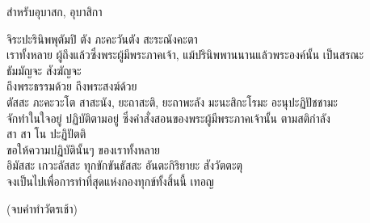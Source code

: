 \documentclass{article}
\begin{document}
\begin{center}สำหรับอุบาสก, อุบาสิกา\end{center}
จิระปะรินิพพุตัมปิ ตัง ภะคะวันตัง สะระณังคะตา\\
\indent เราทั้งหลาย ผู้ถึงแล้วซึ่งพระผู้มีพระภาคเจ้า,
แม้ปรินิพพานนานแล้วพระองค์นั้น เป็นสรณะ\\
ธัมมัญจะ สังฆัญจะ\\
\indent ถึงพระธรรมด้วย ถึงพระสงฆ์ด้วย\\
ตัสสะ ภะคะวะโต สาสะนัง, ยะถาสะติ, ยะถาพะลัง
มะนะสิกะโรมะ อะนุปะฏิปัชชามะ\\
\indent จักทำในใจอยู่ ปฏิบัติตามอยู่ ซึ่งคำสั่งสอนของพระผู้มีพระภาคเจ้านั้น
ตามสติกำลัง\\
สา สา โน ปะฏิปัตติ\\
\indent ขอให้ความปฏิบัตินั้นๆ ของเราทั้งหลาย\\
อิมัสสะ เกวะลัสสะ ทุกขักขันธัสสะ อันตะกิริยายะ สังวัตตะตุ\\
\indent จงเป็นไปเพื่อการทำที่สุดแห่งกองทุกข์ทั้งสิ้นนี้ เทอญ\\
\begin{center}
(จบคำทำวัตรเช้า)
\end{center}
\end{document}
